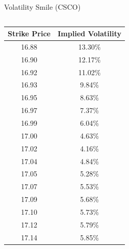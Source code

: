 \documentclass{beamer}
\begin{document}
\begin{frame}[shrink=50]{{\color{cyan}Volatility Smile ({\color{magenta}CSCO})}}
\bigskip
\begin{columns}

\begin{column}{0.3\textwidth}
\begin{table}[H]
\begin{center}
\begin{tabular}{cc}
\hline
\textbf{Strike Price}	& \textbf{Implied Volatility}\\
\hline \hline
16.88	& 13.30\%\\
16.90	& 12.17\%\\
16.92	& 11.02\%\\
16.93	& 9.84\%\\
16.95	& 8.63\%\\
16.97	& 7.37\%\\
16.99	& 6.04\%\\
17.00	& 4.63\%\\
{\color{orange}17.02}	& 4.16\%\\
17.04	& 4.84\%\\
17.05	& 5.28\%\\
17.07	& 5.53\%\\
17.09	& 5.68\%\\
17.10	& 5.73\%\\
17.12	& 5.79\%\\
17.14	& 5.85\%\\
\hline
\end{tabular}
\label{tab:CSCO_volatility_smile}
\end{center}
\end{table}
\end{column}


\end{columns}
\end{frame}
\end{document}
